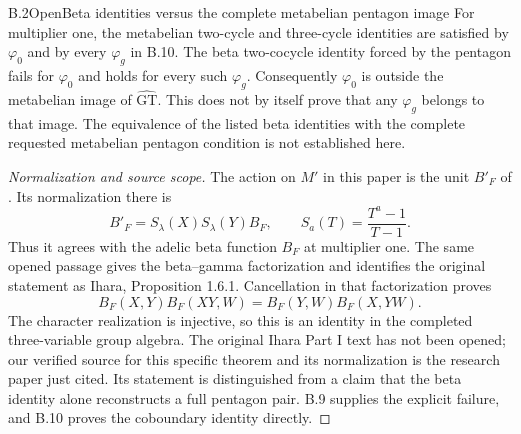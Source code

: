 \begin{statement}{B.2}{Open}{Beta identities versus the complete metabelian pentagon image}
For multiplier one, the metabelian two-cycle and three-cycle
identities are satisfied by $\varphi_0$ and by every $\varphi_g$
in B.10. The beta two-cocycle identity forced by the pentagon fails
for $\varphi_0$ and holds for every such $\varphi_g$.
Consequently $\varphi_0$ is outside the metabelian image of
$\widehat{\mathrm{GT}}$. This does not by itself prove that any
$\varphi_g$ belongs to that image. The equivalence of the listed
beta identities with the complete requested metabelian pentagon
condition is not established here.
\end{statement}
\begin{proof}[Normalization and source scope]
The action on $M'$ in this paper is the unit $B'_F$ of
\cite[\S2.3, p.~101]{PBC_Furusho2003}. Its normalization there is
\[
 B'_F=S_\lambda(X)S_\lambda(Y)B_F,
 \qquad S_a(T)=\frac{T^a-1}{T-1}.
\]
Thus it agrees with the adelic beta function $B_F$ at multiplier
one. The same opened passage gives the beta--gamma factorization
and identifies the original statement as Ihara, Proposition 1.6.1.
Cancellation in that factorization proves
\[
 B_F(X,Y)B_F(XY,W)=B_F(Y,W)B_F(X,YW).
\]
The character realization is injective, so this is an identity in
the completed three-variable group algebra. The original Ihara
Part I text has not been opened; our verified source for this
specific theorem and its normalization is the research paper just
cited. Its statement is distinguished from a claim that the beta
identity alone reconstructs a full pentagon pair. B.9 supplies the
explicit failure, and B.10 proves the coboundary identity directly.
\end{proof}

